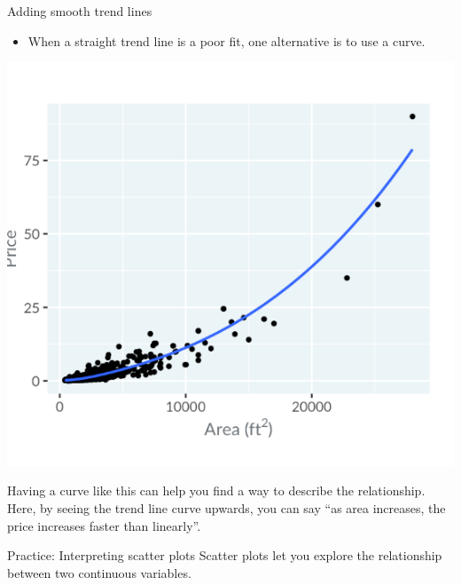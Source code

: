 \documentclass[
  ignorenonframetext,
]{beamer}
\providecommand{\tightlist}{%
  \setlength{\itemsep}{0pt}\setlength{\parskip}{0pt}}
\begin{document}
\begin{frame}{Adding smooth trend lines}
\label{adding-smooth-trend-lines-2}
\begin{itemize}
\tightlist
\item
  When a straight trend line is a poor fit, one alternative is to use a
  curve.
\end{itemize}

\includegraphics{../images/im39.png}

Having a curve like this can help you find a way to describe the
relationship. Here, by seeing the trend line curve upwards, you can say
``as area increases, the price increases faster than linearly''.
\end{frame}

\begin{frame}{Practice: Interpreting scatter plots}
\label{practice-interpreting-scatter-plots}
Scatter plots let you explore the relationship between two continuous
variables.
\end{frame}
\end{document}
